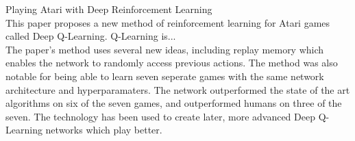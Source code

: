 \documentclass[12pt,letterpaper]{hmcpset}
\begin{document}
{Playing Atari with Deep Reinforcement Learning}\\
This paper proposes a new method of reinforcement learning for Atari games called Deep Q-Learning. Q-Learning is...
\\
The paper's method uses several new ideas, including replay memory which enables the network to randomly access previous actions. The method was also notable for being able to learn seven seperate games with the same network architecture and hyperparamaters. The network outperformed the state of the art algorithms on six of the seven games, and outperformed humans on three of the seven. The technology has been used to create later, more advanced Deep Q-Learning networks which play better.
\end{document}
